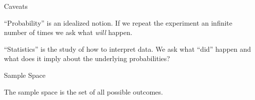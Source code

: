 \begin{frame}{Caveats}

  ``Probability'' is an idealized notion. If we repeat the experiment
  an infinite number of times we ask what \textit{will} happen.

  \vfill

  ``Statistics'' is the study of how to interpret data. We ask what
  ``did'' happen and what does it imply about the underlying
  probabilities?

  \vfill

\end{frame}


\begin{frame}{Sample Space}

  \begin{definition}
    The sample space is the set of all possible outcomes.
  \end{definition}

  
\end{frame}



